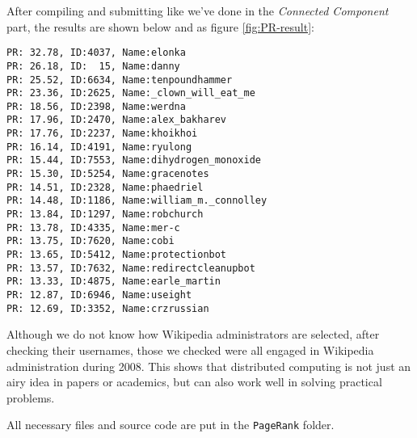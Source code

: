 After compiling and submitting like we've done in the \emph{Connected Component} part, the results are shown below and as figure \ref{fig:PR-result}:

{\small
\begin{verbatim}
PR: 32.78, ID:4037, Name:elonka
PR: 26.18, ID:  15, Name:danny
PR: 25.52, ID:6634, Name:tenpoundhammer
PR: 23.36, ID:2625, Name:_clown_will_eat_me
PR: 18.56, ID:2398, Name:werdna
PR: 17.96, ID:2470, Name:alex_bakharev
PR: 17.76, ID:2237, Name:khoikhoi
PR: 16.14, ID:4191, Name:ryulong
PR: 15.44, ID:7553, Name:dihydrogen_monoxide
PR: 15.30, ID:5254, Name:gracenotes
PR: 14.51, ID:2328, Name:phaedriel
PR: 14.48, ID:1186, Name:william_m._connolley
PR: 13.84, ID:1297, Name:robchurch
PR: 13.78, ID:4335, Name:mer-c
PR: 13.75, ID:7620, Name:cobi
PR: 13.65, ID:5412, Name:protectionbot
PR: 13.57, ID:7632, Name:redirectcleanupbot
PR: 13.33, ID:4875, Name:earle_martin
PR: 12.87, ID:6946, Name:useight
PR: 12.69, ID:3352, Name:crzrussian
\end{verbatim}
}

Although we do not know how Wikipedia administrators are selected, after checking their usernames, those we checked were all engaged in Wikipedia administration during 2008. This shows that distributed computing is not just an airy idea in papers or academics, but can also work well in solving practical problems.

All necessary files and source code are put in the \texttt{PageRank} folder.